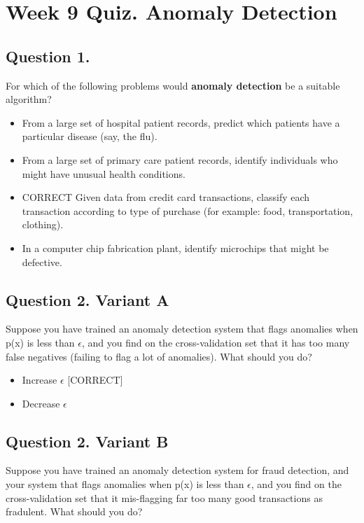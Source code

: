 \documentclass[11pt]{article} %
\begin{document}
\section{Week 9 Quiz. Anomaly Detection}

\subsection*{Question 1. }
For which of the following problems would \textbf{anomaly detection} be a suitable algorithm?

\begin{itemize}
	\item From a large set of hospital patient records, predict which patients have a particular disease (say, the flu).
	\item From a large set of primary care patient records, identify individuals who might have unusual health conditions.
	\item CORRECT
	Given data from credit card transactions, classify each transaction according to type of purchase (for example: food, transportation, clothing).
	\item 
	In a computer chip fabrication plant, identify microchips that might be defective.
\end{itemize}

\subsection*{Question 2. Variant A}
Suppose you have trained an anomaly detection system that flags anomalies when p(x) is less than $\epsilon$, and you find on the cross-validation set that it has 
too many false negatives (failing to flag a lot of anomalies). What should you do?


\begin{itemize}
	\item Increase $\epsilon$ [CORRECT]
	\item Decrease $\epsilon$
\end{itemize}

\subsection*{Question 2. Variant B}
Suppose you have trained an anomaly detection system for fraud detection, and your system that flags 
anomalies when p(x) is less than $\epsilon$, and you find on the 
cross-validation set that it mis-flagging far too many good transactions as fradulent. What should you do?
\end{document}
